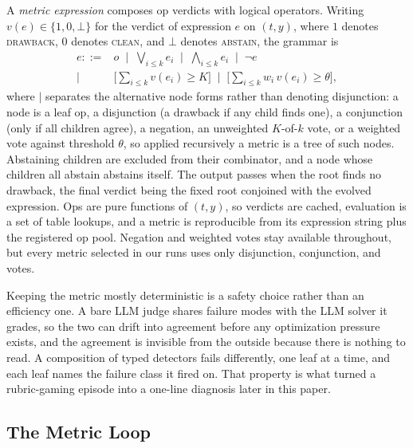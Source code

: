 \documentclass[letterpaper]{article} %
\begin{document}
A \emph{metric expression} composes op verdicts with logical operators. Writing $v(e) \in \{1, 0, \bot\}$ for the verdict of expression $e$ on $(t, y)$, where $1$ denotes \textsc{drawback}, $0$ denotes \textsc{clean}, and $\bot$ denotes \textsc{abstain}, the grammar is
\begin{equation}
\label{eq:grammar}
\begin{aligned}
e \mathrel{::=} {}& o
  \;\;\big|\;\; \textstyle\bigvee_{i \leq k} e_i
  \;\;\big|\;\; \textstyle\bigwedge_{i \leq k} e_i
  \;\;\big|\;\; \neg e \\[2pt]
\big|\;\; & \textstyle\big[\sum_{i \leq k} v(e_i) \geq K\big]
  \;\;\big|\;\; \textstyle\big[\sum_{i \leq k} w_i\, v(e_i) \geq \theta\big],
\end{aligned}
\end{equation}
where $|$ separates the alternative node forms rather than denoting disjunction: a node is a leaf op, a disjunction (a drawback if any child finds one), a conjunction (only if all children agree), a negation, an unweighted $K$-of-$k$ vote, or a weighted vote against threshold $\theta$, so applied recursively a metric is a tree of such nodes. Abstaining children are excluded from their combinator, and a node whose children all abstain abstains itself. The output passes when the root finds no drawback, the final verdict being the fixed root conjoined with the evolved expression. Ops are pure functions of $(t, y)$, so verdicts are cached, evaluation is a set of table lookups, and a metric is reproducible from its expression string plus the registered op pool. Negation and weighted votes stay available throughout, but every metric selected in our runs uses only disjunction, conjunction, and votes.

Keeping the metric mostly deterministic is a safety choice rather than an efficiency one. A bare LLM judge shares failure modes with the LLM solver it grades, so the two can drift into agreement before any optimization pressure exists, and the agreement is invisible from the outside because there is nothing to read. A composition of typed detectors fails differently, one leaf at a time, and each leaf names the failure class it fired on. That property is what turned a rubric-gaming episode into a one-line diagnosis later in this paper.

\subsection{The Metric Loop}
\end{document}
